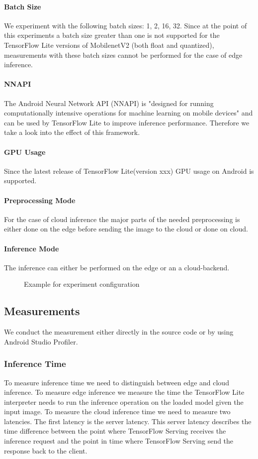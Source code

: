 \paragraph{Batch Size}
We experiment with the following batch sizes: 1, 2, 16, 32. Since at the point of this experiments a batch size greater than one is not supported for the TensorFlow Lite versions of MobilenetV2 (both float and quantized), measurements with these batch sizes cannot be performed for the case of edge inference.
\paragraph{NNAPI}
The Android Neural Network API (NNAPI)
is "designed for running computationally intensive operations for machine learning on mobile devices" \cite{NNAPI} and can be used by TensorFlow Lite to improve inference performance. Therefore we take a look into the effect of this framework.
\paragraph{GPU Usage}
Since the latest release of TensorFlow Lite(version xxx) GPU usage on Android is supported. 
\paragraph{Preprocessing Mode}
For the case of cloud inference the major parts of the needed preprocessing is either done on the edge before sending the image to the cloud or done on cloud.
\paragraph{Inference Mode}
The inference can either be performed on the edge or an a cloud-backend.

\begin{figure}[H]
\centering
 \scalebox{.7}{}

\caption{Example for experiment configuration}
\label{fig:tree}
\end{figure}
\subsection{Measurements}
We conduct the measurement either directly in the source code or by using Android Studio Profiler.
\subsubsection{Inference Time}
To measure inference time we need to  distinguish between edge and cloud inference. To measure edge inference we measure the time the TensorFlow Lite interpreter needs to run the inference operation on the loaded model given the input image.
To measure the cloud inference time we need to measure two latencies. The first latency is the server latency. This server latency describes the time difference between the point where TensorFlow Serving receives the inference request and the point in time where TensorFlow Serving send the response back to the client.



